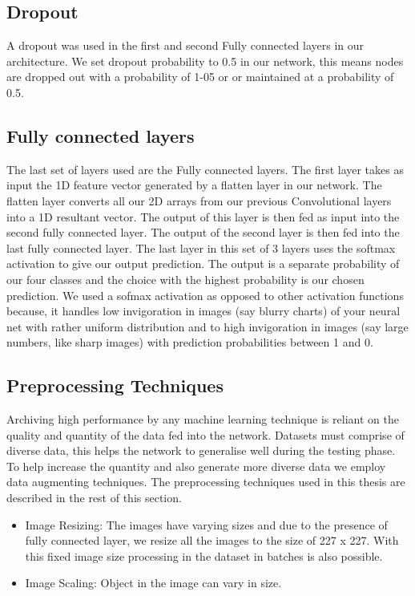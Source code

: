 \documentclass[12pt, a4paper,oneside]{report}
\begin{document}
\subsection{Dropout}
A dropout was used in the first and second Fully connected layers in our architecture. We set dropout probability to 0.5 in our network, this means nodes are dropped out with a probability of 1-05 or or maintained at a probability of 0.5.


\subsection{Fully connected layers}
The last set of layers used are the Fully connected layers. 
The first layer takes as input the 1D feature vector generated by a flatten layer in our network. The flatten layer converts all our 2D arrays from our previous Convolutional layers into a 1D resultant vector. The output of this layer is then fed as input into the second fully connected layer. The output of the second layer is then fed into the last fully connected layer. The last layer in this set of 3 layers uses the softmax activation to give our output prediction. The output is a separate probability of our four classes and the choice with the highest probability is our chosen prediction. We used a sofmax activation as opposed to other activation functions because, it handles low invigoration
in images (say blurry charts) of your neural net with rather uniform distribution and to high invigoration in images (say large numbers, like sharp images) with prediction probabilities between 1 and 0.

\subsection{Preprocessing Techniques}
Archiving high performance by any machine learning technique is reliant on the quality and quantity of the data fed into the network.
Datasets must comprise of diverse data, this helps the network to generalise well during the testing phase. To help increase the quantity and also generate more diverse data we employ data augmenting techniques. The preprocessing techniques used in this thesis are described in the rest of this section.

\begin{itemize}
	\item  Image Resizing: The images have varying sizes and due to the presence of fully connected layer, we resize all the images to the size of 227 x 227. With this fixed image size processing in the dataset in batches is also possible.
	
	\item  Image Scaling: Object in the image can vary in size.
	
	
\end{itemize}
\end{document}
